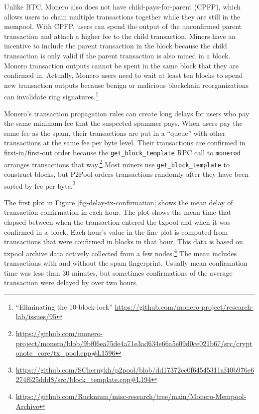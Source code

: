 \documentclass[usletter,11pt,english,openany]{article}
\begin{document}
Unlike BTC, Monero also does not have child-pays-for-parent (CPFP),
which allows users to chain multiple transactions together while they
are still in the mempool. With CPFP, users can spend the output of
the unconfirmed parent transaction and attach a higher fee to the
child transaction. Miners have an incentive to include the parent
transaction in the block because the child transaction is only valid
if the parent transaction is also mined in a block. Monero transaction
outputs cannot be spent in the same block that they are confirmed
in. Actually, Monero users need to wait at least ten blocks to spend
new transaction outputs because benign or malicious blockchain reorganizations
can invalidate ring signatures.\footnote{``Eliminating the 10-block-lock'' \url{https://github.com/monero-project/research-lab/issues/95}}

Monero's transaction propagation rules can create long delays for
users who pay the same minimum fee that the suspected spammer pays.
When users pay the same fee as the spam, their transactions are put
in a ``queue'' with other transactions at the same fee per byte
level. Their transactions are confirmed in first-in/first-out order
because the \texttt{get\_block\_template} RPC call to \texttt{monerod}
arranges transactions that way.\footnote{\url{https://github.com/monero-project/monero/blob/9bf06ea75de4a71e3ad634e66a5e09d0ce021b67/src/cryptonote_core/tx_pool.cpp\#L1596}}
Most miners use \texttt{get\_block\_template} to construct blocks,
but P2Pool orders transactions randomly after they have been sorted
by fee per byte.\footnote{\url{https://github.com/SChernykh/p2pool/blob/dd17372ec0f64545311af40b976e6274f625ddd8/src/block_template.cpp\#L194}}

The first plot in Figure \ref{fig-delay-tx-confirmation} shows the
mean delay of transaction confirmation in each hour. The plot shows
the mean time that elapsed between when the transaction entered the
txpool and when it was confirmed in a block. Each hour's value in
the line plot is computed from transactions that were confirmed in
blocks in that hour. This data is based on txpool archive data actively
collected from a few nodes.\footnote{\url{https://github.com/Rucknium/misc-research/tree/main/Monero-Mempool-Archive}}
The mean includes transactions with and without the spam fingerprint.
Usually mean confirmation time was less than 30 minutes, but sometimes
confirmations of the average transaction were delayed by over two
hours.
\end{document}
